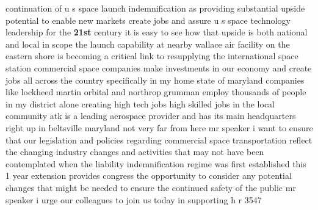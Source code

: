 \documentclass{article}
\begin{document}
continuation of u s space launch indemnification as providing substantial upside potential to enable new markets create jobs and assure u s space technology leadership for the {\bf \color{red} 21st} century it is easy to see how that upside is both national and local in scope the launch capability at nearby wallace air facility on the eastern shore is becoming a critical link to resupplying the international space station commercial space companies make investments in our economy and create jobs all across the country specifically in my home state of maryland companies like lockheed martin orbital and northrop grumman employ thousands of people in my district alone creating high tech jobs high skilled jobs in the local community atk is a leading aerospace provider and has its main headquarters right up in beltsville maryland not very far from here mr speaker i want to ensure that our legislation and policies regarding commercial space transportation reflect the changing industry changes and activities that may not have been contemplated when the liability indemnification regime was first established this 1 year extension provides congress the opportunity to consider any potential changes that might be needed to ensure the continued safety of the public mr speaker i urge our colleagues to join us today in supporting h r 3547
\vspace{8mm}
\end{document}
